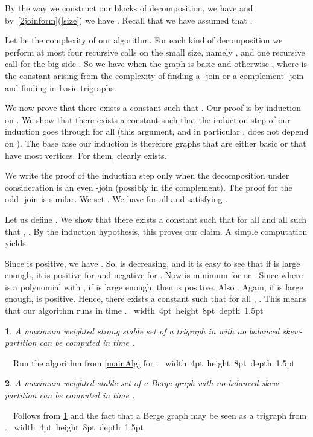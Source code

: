 \documentclass[11 pt] {article}
\newcommand\blackslug{\hbox{\hskip 1pt \vrule width 4pt height 8pt depth 1.5pt
        \hskip 1pt}}
\newcommand\bbox{\hfill \quad \blackslug \medbreak}
\newtheorem{theorem}{}[section]
\newcounter{claim}
\newcommand{\Proof}{\setcounter{claim}{0}\noindent{\bf Proof.}\ \ }
\begin{document}
 By the way we construct our
blocks of decomposition, we have  and
by~\ref{2joinform}(\ref{size}) we have . Recall that we have assumed that .

Let  be the complexity of our algorithm. For each kind of
decomposition we perform at most four recursive calls on the small
size, namely , and one recursive call for the big side .
So we have  when the graph is basic and otherwise
, where  is the
constant arising from the complexity of finding a -join or a
complement -join and finding  in basic trigraphs.


We now prove that there exists a constant  such that .  Our proof is by induction on .  We show that there exists a
constant  such that the induction step of our induction goes
through for all  (this argument, and in particular , does
not depend on ).  The base case our induction is therefore graphs
that are either basic or that have most  vertices.  For them, 
clearly exists.

We write the proof of the induction step only when the decomposition
under consideration is an even -join (possibly in the complement).
The proof for the odd -join is similar.  We set .  We
have  for all  and 
satisfying .

Let us define .  We show
that there exists a constant  such that for all  and all
 such that ,
.  By the induction hypothesis, this proves our claim. A
simple computation yields:






Since  is positive, we have .  So,  is decreasing,
and it is easy to see that if  is large enough, it is positive for
 and negative for .  Now 
is minimum for  or .  Since
 where  is a polynomial with , if  is large enough, then  is positive.  Also
. Again, if  is large enough,
 is positive.  Hence, there exists a
constant  such that for all , .  This means
that our algorithm runs in time . \bbox


\begin{theorem}
  \label{t:Strigraph}
  A maximum weighted strong stable set of a trigraph  in  with no
  balanced skew-partition can be computed in time .
\end{theorem}
\Proof Run the algorithm from \ref{mainAlg} for .  \bbox


\begin{theorem}
  \label{th:alphaG}
  A maximum weighted stable set of a Berge graph with no balanced skew-partition can be computed in time .
\end{theorem}
\Proof Follows from \ref{t:Strigraph} and the fact that a Berge graph may
be seen as a trigraph from .  \bbox
\end{document}
